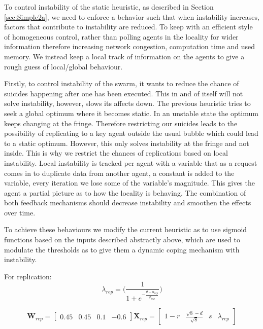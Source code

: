 \documentclass{UoYCSproject}
\begin{document}
To control instability of the static heuristic, as described in Section \ref{sec:Simple2a}, we need to enforce a behavior such that when instability increases, factors that contribute to instability are reduced. 
To keep with an efficient style of homogeneous control, rather than polling agents in the locality for wider information therefore increasing network congestion, computation time and used memory. 
We instead keep a local track of information on the agents to give a rough guess of local/global behaviour. 

Firstly, to control instability of the swarm, it wants to reduce the chance of suicides happening after one has been executed. 
This in and of itself will not solve instability, however, slows its affects down. 
The previous heuristic tries to seek a global optimum where it becomes static. 
In an unstable state the optimum keeps changing at the fringe. 
Therefore restricting our suicides leads to the possibility of replicating to a key agent outside the usual bubble which could lead to a static optimum. 
However, this only solves instability at the fringe and not inside. 
This is why we restrict the chances of replications based on local instability. 
Local instability is tracked per agent with a variable that as a request comes in to duplicate data from another agent, a constant is added to the variable, every iteration we lose some of the variable's magnitude. 
This gives the agent a partial picture as to how the locality is behaving. 
The combination of both feedback mechanisms should decrease instability and smoothen the effects over time.

To achieve these behaviours we modify the current heuristic as to use sigmoid functions based on the inputs described abstractly above, which are used to modulate the thresholds as to give them a dynamic coping mechanism with instability.

For replication:
\begin{equation}
\label{eq:1}
\lambda_{rep} = \big( \frac{1}{1+ e^{- \frac{ \theta - \alpha_{rep} }{ \beta_{rep} } } } \big)
\end{equation}

\begin{equation}
\label{eq:100}
\textbf{W}_{rep} = \begin{bmatrix}0.45 & 0.45 & 0.1 & -0.6 \end{bmatrix}
\textbf{X}_{rep} = \begin{bmatrix} 1-r & \frac{\sqrt{8}-d}{\sqrt{8}} & s & \lambda_{rep} \end{bmatrix}
\end{equation}
\end{document}
